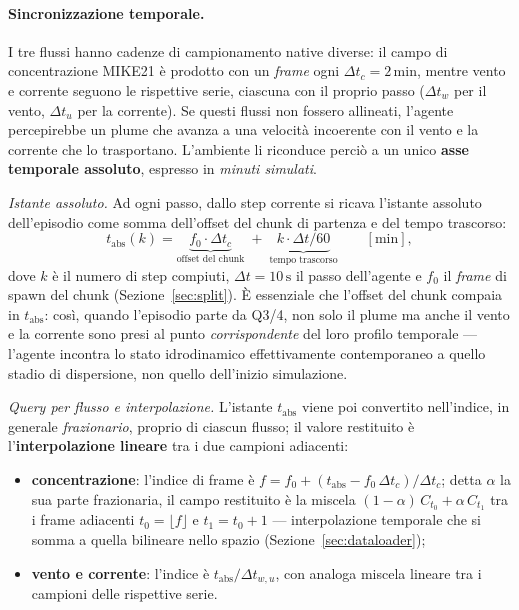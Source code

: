 \paragraph{Sincronizzazione temporale.}
I tre flussi hanno cadenze di campionamento native diverse: il campo di concentrazione
MIKE21 \`e prodotto con un \emph{frame} ogni $\Delta t_c = 2\,\text{min}$, mentre vento e
corrente seguono le rispettive serie, ciascuna con il proprio passo ($\Delta t_w$ per il
vento, $\Delta t_u$ per la corrente). Se questi flussi non fossero allineati, l'agente
percepirebbe un plume che avanza a una velocit\`a incoerente con il vento e la corrente che
lo trasportano. L'ambiente li riconduce perci\`o a un unico \textbf{asse temporale
assoluto}, espresso in \emph{minuti simulati}.

\medskip\noindent\emph{Istante assoluto.} Ad ogni passo, dallo step corrente si ricava
l'istante assoluto dell'episodio come somma dell'offset del chunk di partenza e del tempo
trascorso:
\begin{equation}
  t_{\text{abs}}(k) = \underbrace{f_0 \cdot \Delta t_c}_{\text{offset del chunk}}
  \;+\; \underbrace{k \cdot \Delta t / 60}_{\text{tempo trascorso}}
  \qquad [\text{min}],
  \label{eq:tabs}
\end{equation}
dove $k$ \`e il numero di step compiuti, $\Delta t = 10\,\text{s}$ il passo dell'agente e
$f_0$ il \emph{frame} di spawn del chunk (Sezione~\ref{sec:split}). \`E essenziale che
l'offset del chunk compaia in $t_{\text{abs}}$: cos\`i, quando l'episodio parte da Q3/4, non
solo il plume ma anche il vento e la corrente sono presi al punto \emph{corrispondente} del
loro profilo temporale --- l'agente incontra lo stato idrodinamico effettivamente
contemporaneo a quello stadio di dispersione, non quello dell'inizio simulazione.

\medskip\noindent\emph{Query per flusso e interpolazione.} L'istante $t_{\text{abs}}$ viene
poi convertito nell'indice, in generale \emph{frazionario}, proprio di ciascun flusso; il
valore restituito \`e l'\textbf{interpolazione lineare} tra i due campioni adiacenti:
\begin{itemize}[leftmargin=1.4em, itemsep=2pt]
  \item \textbf{concentrazione}: l'indice di frame \`e
        $f = f_0 + (t_{\text{abs}} - f_0\,\Delta t_c)/\Delta t_c$; detta $\alpha$ la sua parte
        frazionaria, il campo restituito \`e la miscela
        $(1-\alpha)\,C_{t_0} + \alpha\,C_{t_1}$ tra i frame adiacenti $t_0=\lfloor f\rfloor$ e
        $t_1=t_0+1$ --- interpolazione temporale che si somma a quella bilineare nello spazio
        (Sezione~\ref{sec:dataloader});
  \item \textbf{vento e corrente}: l'indice \`e $t_{\text{abs}}/\Delta t_{w,u}$, con analoga
        miscela lineare tra i campioni delle rispettive serie.
\end{itemize}

